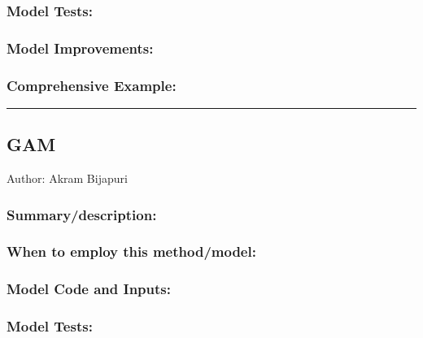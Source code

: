\documentclass[
]{article}
\begin{document}
\hypertarget{model-tests-8}{%
\subsubsection{Model Tests:}\label{model-tests-8}}

\hypertarget{model-improvements-8}{%
\subsubsection{Model Improvements:}\label{model-improvements-8}}

\hypertarget{comprehensive-example-8}{%
\subsubsection{Comprehensive Example:}\label{comprehensive-example-8}}

\begin{center}\rule{0.5\linewidth}{0.5pt}\end{center}

\hypertarget{gam}{%
\subsection{GAM}\label{gam}}

Author: Akram Bijapuri

\hypertarget{summarydescription-9}{%
\subsubsection{Summary/description:}\label{summarydescription-9}}

\hypertarget{when-to-employ-this-methodmodel-9}{%
\subsubsection{When to employ this
method/model:}\label{when-to-employ-this-methodmodel-9}}

\hypertarget{model-code-and-inputs-9}{%
\subsubsection{Model Code and Inputs:}\label{model-code-and-inputs-9}}

\hypertarget{model-tests-9}{%
\subsubsection{Model Tests:}\label{model-tests-9}}
\end{document}
